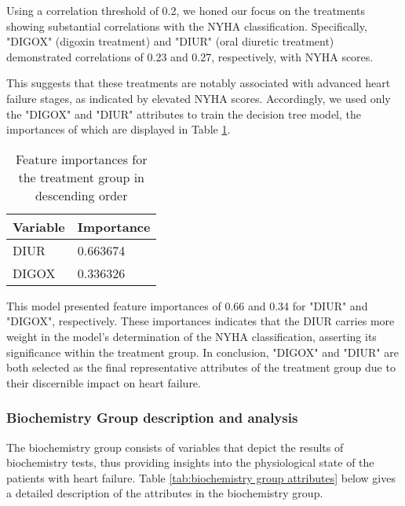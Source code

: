         Using a correlation threshold of 0.2, we honed our focus on the treatments showing substantial correlations with the NYHA classification. Specifically, "DIGOX" (digoxin treatment) and "DIUR" (oral diuretic treatment) demonstrated correlations of 0.23 and 0.27, respectively, with NYHA scores.

        This suggests that these treatments are notably associated with advanced heart failure stages, as indicated by elevated NYHA scores. Accordingly, we used only the "DIGOX" and "DIUR" attributes to train the decision tree model, the importances of which are displayed in Table \ref{tab:treatment group feature importances}.
        
        \begin{table}[H]
          \centering
          \caption{Feature importances for the treatment group in descending order}
          \label{tab:treatment group feature importances}
          \begin{adjustbox}{center}
              \begin{tabular}{|l|l|}
                  \hline
                  \textbf{Variable} & \textbf{Importance} \\ \hline
                  DIUR               & 0.663674        \\
                  DIGOX            & 0.336326         \\ \hline
                  \end{tabular}
          \end{adjustbox}
      \end{table}

      This model presented feature importances of 0.66 and 0.34 for "DIUR" and "DIGOX", respectively. These importances indicates that the DIUR carries more weight in the model's determination of the NYHA classification, asserting its significance within the treatment group. In conclusion, "DIGOX" and "DIUR" are both selected as the final representative attributes of the treatment group due to their discernible impact on heart failure. 

\subsubsection{Biochemistry Group description and analysis}
      The biochemistry group consists of variables that depict the results of biochemistry tests, thus providing insights into the physiological state of the patients with heart failure. Table \ref{tab:biochemistry group attributes} below gives a detailed description of the attributes in the biochemistry group.

